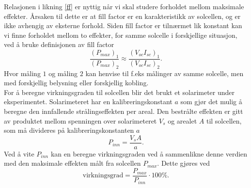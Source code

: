 \documentclass[%
 reprint,
 amsmath,amssymb,
 aps,
 norsk,
 booktabs
]{revtex4-1}
\begin{document}
Relasjonen i likning \eqref{ff} er nyttig når vi skal studere forholdet mellom maksimale effekter. Årsaken til dette er at fill factor er en karakteristikk av solcellen, og er ikke avhengig av eksterne forhold. Siden fill factor er tilnærmet lik konstant kan vi finne forholdet mellom to effekter, for samme solcelle i forskjellige situasjon, ved å bruke definisjonen av fill factor
\begin{equation}
  \frac{\left(P_{max}\right)_1}{\left(P_{max}\right)_2} \approx \frac{\left(V_{oc}I_{sc}\right)_1}{\left(V_{oc}I_{sc}\right)_2}. \label{maxP}
\end{equation}Hvor måling $1$ og måling $2$ kan henvise til f.eks målinger av samme solcelle, men med forskjellig belysning eller forskjellig kobling.\\
For å beregne virkningsgraden til solcellen blir det brukt et solarimeter under eksperimentet. Solarimeteret har en kalibreringskonstant $a$ som gjør det mulig å beregne den innfallende strålingseffekten per areal. Den bestrålte effekten er gitt av produktet mellom spenningen over solarimeteret $V_s$ og arealet $A$ til solcellen, som må divideres på kalibreringskonstanten $a$
\begin{equation}
  P_{inn} = \frac{V_sA}{a} \label{kalibrering}.
\end{equation}
Ved å vite $P_{inn}$ kan en beregne virkningsgraden ved å sammenlikne denne verdien med den maksimale effekten målt fra solcellen $P_{max}$. Dette gjøres ved
\begin{equation}
  \text{virkningsgrad} = \frac{P_{max}}{P_{inn}}\cdot 100\%\label{effekt}.
\end{equation}
\end{document}
